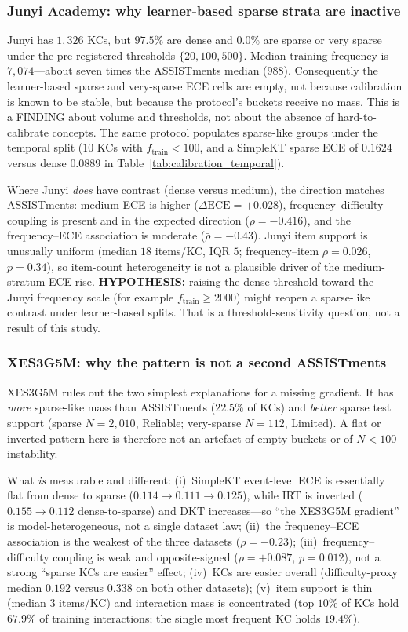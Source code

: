 \subsubsection*{Junyi Academy: why learner-based sparse strata are inactive}
Junyi has $1{,}326$ KCs, but $97.5\%$ are dense and $0.0\%$ are sparse or very sparse under the pre-registered thresholds $\{20,100,500\}$.
Median training frequency is $7{,}074$---about seven times the ASSISTments median ($988$).
Consequently the learner-based sparse and very-sparse ECE cells are empty, not because calibration is known to be stable, but because the protocol's buckets receive no mass.
This is a FINDING about volume and thresholds, not about the absence of hard-to-calibrate concepts.
The same protocol populates sparse-like groups under the temporal split ($10$ KCs with $f_{\mathrm{train}}<100$, and a SimpleKT sparse ECE of $0.1624$ versus dense $0.0889$ in Table~\ref{tab:calibration_temporal}).

Where Junyi \emph{does} have contrast (dense versus medium), the direction matches ASSISTments: medium ECE is higher ($\Delta\mathrm{ECE}=+0.028$), frequency--difficulty coupling is present and in the expected direction ($\rho=-0.416$), and the frequency--ECE association is moderate ($\bar{\rho}=-0.43$).
Junyi item support is unusually uniform (median $18$ items/KC, IQR $5$; frequency--item $\rho=0.026$, $p=0.34$), so item-count heterogeneity is not a plausible driver of the medium-stratum ECE rise.
\textbf{HYPOTHESIS:} raising the dense threshold toward the Junyi frequency scale (for example $f_{\mathrm{train}}\ge 2000$) might reopen a sparse-like contrast under learner-based splits.
That is a threshold-sensitivity question, not a result of this study.

\subsubsection*{XES3G5M: why the pattern is not a second ASSISTments}
XES3G5M rules out the two simplest explanations for a missing gradient.
It has \emph{more} sparse-like mass than ASSISTments ($22.5\%$ of KCs) and \emph{better} sparse test support (sparse $N=2{,}010$, Reliable; very-sparse $N=112$, Limited).
A flat or inverted pattern here is therefore not an artefact of empty buckets or of $N<100$ instability.

What \emph{is} measurable and different:
(i)~SimpleKT event-level ECE is essentially flat from dense to sparse ($0.114\to 0.111\to 0.125$), while IRT is inverted ($0.155\to 0.112$ dense-to-sparse) and DKT increases---so ``the XES3G5M gradient'' is model-heterogeneous, not a single dataset law;
(ii)~the frequency--ECE association is the weakest of the three datasets ($\bar{\rho}=-0.23$);
(iii)~frequency--difficulty coupling is weak and opposite-signed ($\rho=+0.087$, $p=0.012$), not a strong ``sparse KCs are easier'' effect;
(iv)~KCs are easier overall (difficulty-proxy median $0.192$ versus $0.338$ on both other datasets);
(v)~item support is thin (median $3$ items/KC) and interaction mass is concentrated (top $10\%$ of KCs hold $67.9\%$ of training interactions; the single most frequent KC holds $19.4\%$).

